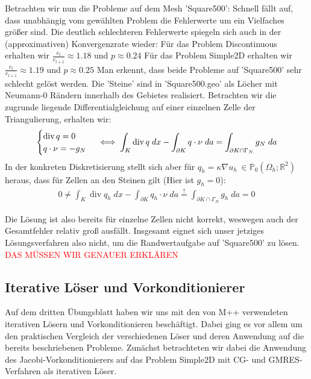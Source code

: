 \documentclass[12pt,a4paper]{scrartcl}
\newcommand{\R}{\mathbb{R}}
\DeclareMathOperator{\dive}{div}
\numberwithin{equation}{section}
\begin{document}
\begin{enumerate}[label=(\roman*)]
Betrachten wir nun die Probleme auf dem Mesh 'Square500': Schnell fällt auf, dass unabhängig vom gewählten Problem die Fehlerwerte um ein Vielfaches größer sind. Die deutlich schlechteren Fehlerwerte spiegeln sich auch in der (approximativen) Konvergenzrate wieder: \newline
Für das Problem Discontinuous erhalten wir $ \frac{e_l}{e_{l+1}} \approx 1.18 $ und $p \approx 0.24$ \newline
Für das Problem Simple2D erhalten wir $ \frac{e_l}{e_{l+1}} \approx 1.19 $ und $p \approx 0.25$ \newline
Man erkennt, dass beide Probleme auf 'Square500' sehr schlecht gelöst werden.
Die 'Steine' sind in 'Square500.geo' als Löcher mit Neumann-0 Rändern innerhalb des Gebietes realisiert. 
Betrachten wir die zugrunde liegende Differentialgleichung auf einer einzelnen Zelle der Triangulierung, erhalten wir:
\begin{align*}
	\begin{cases}
		\dive q = 0 \\
			q \cdot \nu = -g_N 
	\end{cases}
	\iff \int_K{ \dive q \; dx} - \int_{ \partial K}{q\cdot \nu \; da} = \int_{ \partial K \cap \Gamma_N} {g_N \; da } 
\newline	
\end{align*}
In der konkreten Diskretisierung stellt sich aber für $q_h = \kappa \nabla u_h \ \in \mathbb{P}_0( \Omega_h ; \R^2) $ heraus, dass für Zellen an den Steinen gilt (Hier ist $g_h = 0$): 
\begin{align*}	
	 0 \neq \int_K{ \dive q_h \; dx} - \int_{ \partial K}{q_h \cdot \nu \; da} \stackrel{!}{=} \int_{ \partial K \cap \Gamma_N} {g_h \; da } = 0 
\end{align*}

Die Lösung ist also bereits für einzelne Zellen nicht korrekt, weswegen auch der Gesamtfehler relativ groß ausfällt. Insgesamt eignet sich unser jetziges Lösungsverfahren also nicht, um die Randwertaufgabe auf 'Square500' zu lösen.
\textcolor{red}{DAS MÜSSEN WIR GENAUER ERKLÄREN}




\end{enumerate}

\subsection{Iterative Löser und Vorkonditionierer}

Auf dem dritten Übungsblatt haben wir uns mit den von M++ verwendeten iterativen Lösern und Vorkonditionieren beschäftigt.
Dabei ging es vor allem um den praktischen Vergleich der verschiedenen Löser und deren Anwendung auf die bereits beschriebenen Probleme.
Zunächst betrachteten wir dabei die Anwendung des Jacobi-Vorkonditionierers auf das Problem Simple2D mit CG- und GMRES-Verfahren als iterativen Löser.
\end{document}
